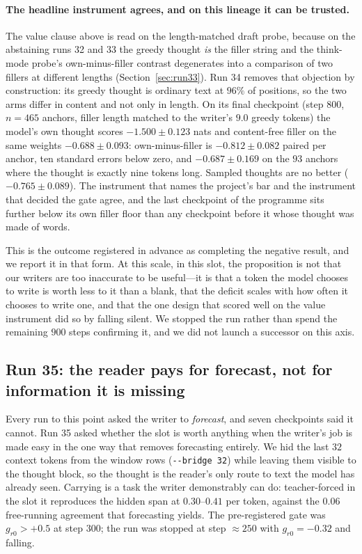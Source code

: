 \documentclass{article} %
\begin{document}
\paragraph{The headline instrument agrees, and on this lineage it can be trusted.} The value
clause above is read on the length-matched draft probe, because on the abstaining runs 32 and 33
the greedy thought \emph{is} the filler string and the think-mode probe's own-minus-filler
contrast degenerates into a comparison of two fillers at different lengths (Section~\ref{sec:run33}).
Run 34 removes that objection by construction: its greedy thought is ordinary text at $96\%$ of
positions, so the two arms differ in content and not only in length. On its final checkpoint
(step $800$, $n=465$ anchors, filler length matched to the writer's $9.0$ greedy tokens) the
model's own thought scores $-1.500 \pm 0.123$ nats and content-free filler on the same weights
$-0.688 \pm 0.093$: own-minus-filler is $-0.812 \pm 0.082$ paired per anchor, ten standard
errors below zero, and $-0.687 \pm 0.169$ on the $93$ anchors where the thought is exactly nine
tokens long. Sampled thoughts are no better ($-0.765 \pm 0.089$). The instrument that names the
project's bar and the instrument that decided the gate agree, and the last checkpoint of the
programme sits further below its own filler floor than any checkpoint before it whose thought
was made of words.

This is the outcome registered in advance as completing the negative result, and we report it in
that form. At this scale, in this slot, the proposition is not that our writers are too
inaccurate to be useful---it is that a token the model chooses to write is worth less to it than
a blank, that the deficit scales with how often it chooses to write one, and that the one design
that scored well on the value instrument did so by falling silent. We stopped the run rather
than spend the remaining $900$ steps confirming it, and we did not launch a successor on this
axis.

\subsection{Run 35: the reader pays for forecast, not for information it is missing}
\label{sec:run35}

Every run to this point asked the writer to \emph{forecast}, and seven checkpoints said it cannot.
Run 35 asked whether the slot is worth anything when the writer's job is made easy in the one way
that removes forecasting entirely. We hid the last $32$ context tokens from the window rows
(\texttt{-{}-bridge 32}) while leaving them visible to the thought block, so the thought is the
reader's only route to text the model has already seen. Carrying is a task the writer demonstrably
can do: teacher-forced in the slot it reproduces the hidden span at $0.30$--$0.41$ per token,
against the $0.06$ free-running agreement that forecasting yields. The pre-registered gate was
$g_{r0} > +0.5$ at step $300$; the run was stopped at step ${\approx}250$ with $g_{r0} = -0.32$
and falling.
\end{document}

